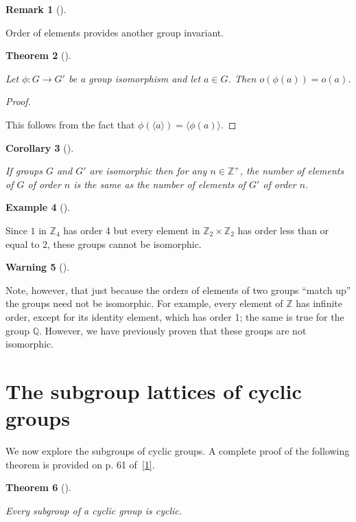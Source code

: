 \documentclass[10pt,]{book}
\theoremstyle{plain}
\newtheorem{theorem}{Theorem}[section]
\newtheorem{corollary}[theorem]{Corollary}
\theoremstyle{definition}
\theoremstyle{definition}
\newtheorem{remark}[theorem]{Remark}
\newtheorem{warning}[theorem]{Warning}
\theoremstyle{definition}
\newtheorem{example}[theorem]{Example}
\theoremstyle{definition}
\numberwithin{equation}{section}
\def\Z{\mathbb{Z}}
\def\Q{\mathbb{Q}}
\begin{document}
\begin{remark}[]\label{remark-24}

      Order of elements provides another group invariant.
\end{remark}
\begin{theorem}[{}]\label{ophia}

        Let \(\phi:G\to G'\) be a group isomorphism and let \(a\in G\). Then \(o(\phi(a))=o(a)\).
\end{theorem}
\begin{proof}\hypertarget{proof-26}{}

      This follows from the fact that \(\phi(\langle a\rangle )=\langle \phi(a)\rangle\).
\end{proof}
\begin{corollary}[{}]\label{corollary-4}

        If groups \(G\) and \(G'\) are isomorphic then for any \(n\in \Z^+\), the number of elements of \(G\) of order \(n\) is the same as the number of elements of \(G'\) of order \(n\).
\end{corollary}
\begin{example}[]\label{example-47}

        Since \(1\) in \(\Z_4\) has order 4 but every element in \(\Z_2 \times \Z_2\) has order less than or equal to 2, these groups cannot be isomorphic.
\end{example}
\begin{warning}[]\label{warning-15}

      Note, however, that just because the orders of elements of two groups ``match up'' the groups need not be isomorphic. For example, every element of \(\Z\) has infinite order, except for its identity element, which has order 1; the same is true for the group \(\Q\). However, we have previously proven that these groups are not isomorphic.
\end{warning}
\typeout{************************************************}
\typeout{************************************************}
\section[{The subgroup lattices of cyclic groups}]{The subgroup lattices of cyclic groups}\label{section-16}

    We now explore the subgroups of cyclic groups. A complete proof of the following theorem is provided on p. 61 of~\hyperlink{F}{[1]}.
\begin{theorem}[{}]\label{subc}

        Every subgroup of a cyclic group is cyclic.
\end{theorem}
\par
\end{document}

